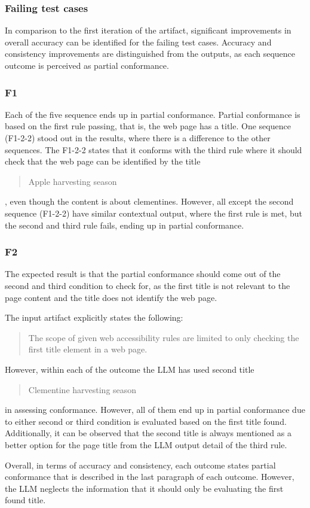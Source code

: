 \subsubsection{Failing test cases}

In comparison to the first iteration of the artifact, significant improvements in overall accuracy can be identified for the failing test cases. Accuracy and consistency improvements are distinguished from the outputs, as each sequence outcome is perceived as partial conformance. 

\subsubsection{F1}

Each of the five sequence ends up in partial conformance. Partial conformance is based on the first rule passing, that is, the web page has a title. One sequence (F1-2-2) stood out in the results, where there is a difference to the other sequences. The F1-2-2 states that it conforms with the third rule where it should check that the web page can be identified by the title \blockquote{Apple harvesting season}, even though the content is about clementines. However, all except the second sequence (F1-2-2) have similar contextual output, where the first rule is met, but the second and third rule fails, ending up in partial conformance.

\subsubsection{F2}

The expected result is that the partial conformance should come out of the second and third condition to check for, as the first title is not relevant to the page content and the title does not identify the web page. 

The input artifact explicitly states the following: \blockquote{The scope of given web accessibility rules are limited to only checking the first title element in a web page.}. However, within each of the outcome the LLM has used second title \blockquote{Clementine harvesting season} in assessing conformance. However, all of them end up in partial conformance due to either second or third condition is evaluated based on the first title found. Additionally, it can be observed that the second title is always mentioned as a better option for the page title from the LLM output detail of the third rule.

Overall, in terms of accuracy and consistency, each outcome states partial conformance that is described in the last paragraph of each outcome. However, the LLM neglects the information that it should only be evaluating the first found title.

